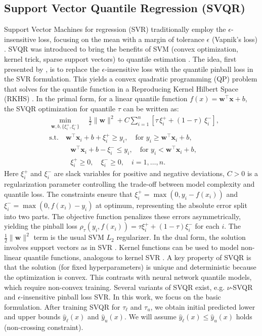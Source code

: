\documentclass{article}
\begin{document}
\subsection{Support Vector Quantile Regression (SVQR)}
Support Vector Machines for regression (SVR) traditionally employ the $\epsilon$-insensitive loss, focusing on the mean with a margin of tolerance $\epsilon$ (Vapnik's loss) \citep{Vapnik1995NatureOS}. SVQR was introduced to bring the benefits of SVM (convex optimization, kernel trick, sparse support vectors) to quantile estimation \citep{Takeuchi2006NonparametricQE}. The idea, first presented by \cite{Takeuchi2006NonparametricQE}, is to replace the $\epsilon$-insensitive loss with the quantile pinball loss in the SVR formulation. This yields a convex quadratic programming (QP) problem that solves for the quantile function in a Reproducing Kernel Hilbert Space (RKHS) \citep{Takeuchi2006NonparametricQE}. In the primal form, for a linear quantile function $f(x) = \mathbf{w}^\top \mathbf{x} + b$, the SVQR optimization for quantile $\tau$ can be written as:
\begin{equation} \label{eq:svqr_primal}
\begin{aligned}
& \min_{\mathbf{w}, b, \{\xi_i^+, \xi_i^-\}} \quad \frac{1}{2}\|\mathbf{w}\|^2 + C \sum_{i=1}^n [\tau\,\xi_i^+ + (1-\tau)\,\xi_i^-], \\
& \text{s.t.} \quad \mathbf{w}^\top \mathbf{x}_i + b + \xi_i^+ \geq y_i, \quad \text{for } y_i \geq \mathbf{w}^\top \mathbf{x}_i + b,\\
& \quad \quad \quad \mathbf{w}^\top \mathbf{x}_i + b - \xi_i^- \leq y_i, \quad \text{for } y_i < \mathbf{w}^\top \mathbf{x}_i + b,\\
& \quad \quad \quad \xi_i^+ \geq 0, \quad \xi_i^- \geq 0, \quad i=1,\dots,n.
\end{aligned}
\end{equation}
Here $\xi_i^+$ and $\xi_i^-$ are slack variables for positive and negative deviations, $C>0$ is a regularization parameter controlling the trade-off between model complexity and quantile loss. The constraints ensure that $\xi_i^+ = \max(0, y_i - f(x_i))$ and $\xi_i^- = \max(0, f(x_i) - y_i)$ at optimum, representing the absolute error split into two parts. The objective function penalizes these errors asymmetrically, yielding the pinball loss $\rho_{\tau}(y_i, f(x_i)) = \tau\xi_i^+ + (1-\tau)\xi_i^-$ for each $i$. The $\frac{1}{2}\|\mathbf{w}\|^2$ term is the usual SVM $L_2$ regularizer.
In the dual form, the solution involves support vectors as in SVR \citep{Takeuchi2006NonparametricQE}. Kernel functions can be used to model non-linear quantile functions, analogous to kernel SVR \citep{Takeuchi2006NonparametricQE}. A key property of SVQR is that the solution (for fixed hyperparameters) is unique and deterministic because the optimization is convex. This contrasts with neural network quantile models, which require non-convex training. Several variants of SVQR exist, e.g. $\nu$-SVQR and $\epsilon$-insensitive pinball loss SVR. In this work, we focus on the basic formulation. After training SVQR for $\tau_{\ell}$ and $\tau_{u}$, we obtain initial predicted lower and upper bounds $\hat{y}_{\ell}(x)$ and $\hat{y}_{u}(x)$. We will assume $\hat{y}_{\ell}(x) \le \hat{y}_{u}(x)$ holds (non-crossing constraint).
\end{document}

